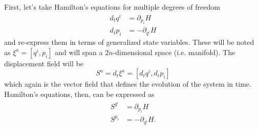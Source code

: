 First, let's take Hamilton's equations for multiple degrees of freedom
\begin{equation}\label{rp-cm-hmd-condEquations}
	\tag{HM-ND}
	\begin{aligned}
		d_t q^i &= \partial_{p_i} H \\
		d_t p_i &= - \partial_{q^i} H
	\end{aligned}
\end{equation}
and re-express them in terms of generalized state variables. These will be noted as $\xi^a = [q^i, p_i]$ and will span a $2n$-dimensional space (i.e. manifold). The displacement field will be
\begin{equation}\label{rp-cm-displacementNd}
	S^a = d_t \xi^a = [d_t q^i, d_t p_i]
\end{equation}
which again is the vector field that defines the evolution of the system in time. Hamilton's equations, then, can be expressed as
\begin{equation}
	\begin{aligned}
		S^{q^i} &= \partial_{p_i} H \\
		S^{p_i} &= - \partial_{q^i} H.
	\end{aligned}
\end{equation}

